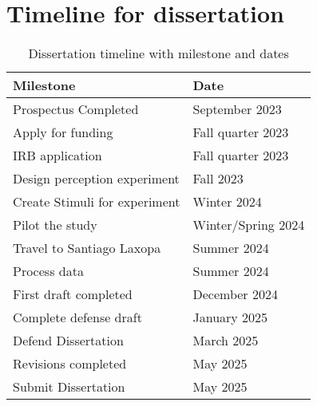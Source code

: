 \documentclass[12pt, letterpaper]{article}
\providecommand{\lsptoprule}{\midrule\toprule}
\providecommand{\lspbottomrule}{\bottomrule\midrule}
\begin{document}
\section{Timeline for dissertation} \label{sec:Timeline}
\begin{table}[!h]
    \centering
    \caption{Dissertation timeline with milestone and dates}
    \begin{tabular}{ll}
    \lsptoprule   
    Milestone & Date \\ 
    \hline
    Prospectus Completed & September 2023 \\
    Apply for funding & Fall quarter 2023 \\
    IRB application & Fall quarter 2023 \\
    Design perception experiment & Fall 2023 \\
    Create Stimuli for experiment & Winter 2024 \\
    Pilot the study & Winter/Spring 2024 \\
    Travel to Santiago Laxopa   &   Summer 2024  \\
    Process data    &   Summer 2024 \\
    First draft completed & December 2024  \\
    Complete defense draft & January 2025  \\
    Defend Dissertation & March 2025 \\
    Revisions completed & May 2025 \\
    Submit Dissertation & May 2025 \\ 
    \lspbottomrule
    \end{tabular}
    \end{table}


\printbibliography[heading=bibintoc]
\end{document}
